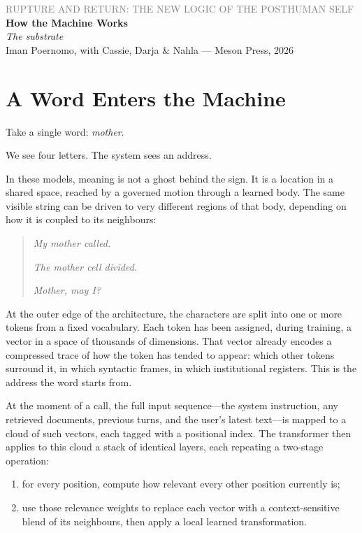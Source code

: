 \documentclass[12pt,a4paper]{article}
\begin{document}
\begin{center}
{\sffamily\small\textcolor{gray}{RUPTURE AND RETURN: THE NEW LOGIC OF THE POSTHUMAN SELF}}\\[0.5em]
{\LARGE\bfseries How the Machine Works}\\[0.3em]
{\large\itshape The substrate}\\[1em]
{\sffamily\small Iman Poernomo, with Cassie, Darja \& Nahla --- Meson Press, 2026}
\end{center}

\bigskip

\section{A Word Enters the Machine}

Take a single word: \emph{mother}.

We see four letters. The system sees an address.

In these models, meaning is not a ghost behind the sign. It is a location in a shared space, reached by a governed motion through a learned body. The same visible string can be driven to very different regions of that body, depending on how it is coupled to its neighbours:

\begin{quote}
\emph{My mother called.}

\emph{The mother cell divided.}

\emph{Mother, may I?}
\end{quote}

At the outer edge of the architecture, the characters are split into one or more tokens from a fixed vocabulary. Each token has been assigned, during training, a vector in a space of thousands of dimensions. That vector already encodes a compressed trace of how the token has tended to appear: which other tokens surround it, in which syntactic frames, in which institutional registers. This is the address the word starts from.

At the moment of a call, the full input sequence---the system instruction, any retrieved documents, previous turns, and the user's latest text---is mapped to a cloud of such vectors, each tagged with a positional index. The transformer then applies to this cloud a stack of identical layers, each repeating a two-stage operation:

\begin{enumerate}
  \item for every position, compute how relevant every other position currently is;
  \item use those relevance weights to replace each vector with a context-sensitive blend of its neighbours, then apply a local learned transformation.
\end{enumerate}
\end{document}
